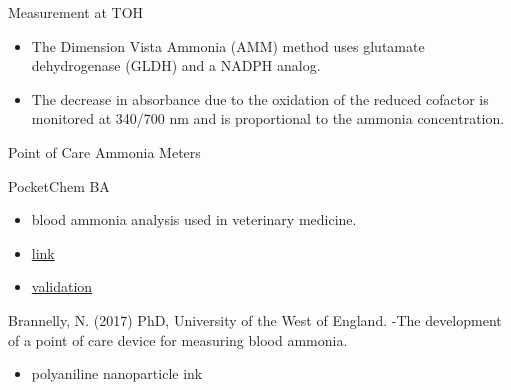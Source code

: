 \documentclass[presentation, smaller]{beamer}
\begin{document}
\begin{frame}[label={sec:orgheadline8}]{Measurement at TOH}
\begin{itemize}
\item The Dimension Vista Ammonia (AMM) method uses glutamate dehydrogenase (GLDH) and a NADPH analog.
\end{itemize}

\begin{block}{}
\centering
{}
\end{block}

\begin{itemize}
\item The decrease in absorbance due to the oxidation of the reduced
cofactor is monitored at 340/700 nm and is proportional to the
ammonia concentration.
\end{itemize}
\end{frame}

\begin{frame}[label={sec:orgheadline9}]{Point of Care Ammonia Meters}
\begin{block}{PocketChem BA}
\begin{itemize}
\item blood ammonia analysis used in veterinary medicine.
\item \href{http://www.woodleyequipment.com/laboratory-diagnostics/clinical-chemistry/pocketchem-ba-blood-ammonia-analyser-474-140-.php}{link}
\item \href{http://onlinelibrary.wiley.com/doi/10.1111/j.1939-165X.2008.00024.x/abstract;jsessionid=365F3D4A44D8D11C6511CA0B223D065B.f03t03}{validation}
\end{itemize}
\end{block}

\begin{block}{Brannelly, N. (2017) PhD, University of the West of England.}
-The development of a point of care device for measuring blood ammonia.
\begin{itemize}
\item polyaniline nanoparticle ink
\end{itemize}
\end{block}
\end{frame}
\end{document}
